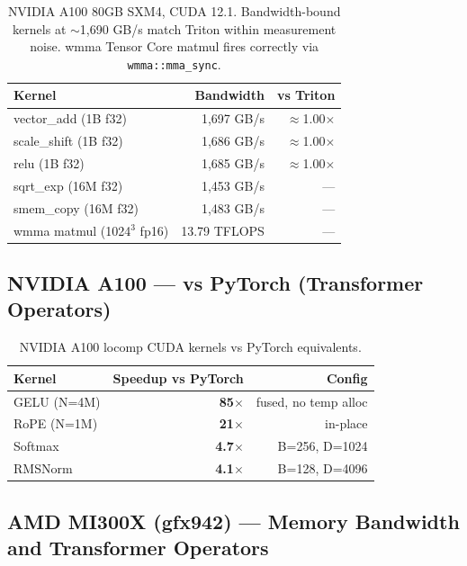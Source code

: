 \documentclass[10pt,twocolumn]{article}
\begin{document}
\begin{table}[H]
\centering
\footnotesize
\begin{tabular}{@{}lrr@{}}
\toprule
\textbf{Kernel} & \textbf{Bandwidth} & \textbf{vs Triton} \\
\midrule
vector\_add (1B f32) & 1,697 GB/s & $\approx$1.00$\times$ \\
scale\_shift (1B f32) & 1,686 GB/s & $\approx$1.00$\times$ \\
relu (1B f32) & 1,685 GB/s & $\approx$1.00$\times$ \\
sqrt\_exp (16M f32) & 1,453 GB/s & --- \\
smem\_copy (16M f32) & 1,483 GB/s & --- \\
wmma matmul (1024$^3$ fp16) & 13.79 TFLOPS & --- \\
\bottomrule
\end{tabular}
\caption{NVIDIA A100 80GB SXM4, CUDA 12.1. Bandwidth-bound kernels at
${\sim}$1,690 GB/s match Triton within measurement noise. wmma Tensor Core
matmul fires correctly via \texttt{wmma::mma\_sync}.}
\label{tab:a100-bw}
\end{table}

\subsection{NVIDIA A100 --- vs PyTorch (Transformer Operators)}

\begin{table}[H]
\centering
\footnotesize
\begin{tabular}{@{}lrr@{}}
\toprule
\textbf{Kernel} & \textbf{Speedup vs PyTorch} & \textbf{Config} \\
\midrule
GELU (N=4M) & \textbf{85$\times$} & fused, no temp alloc \\
RoPE (N=1M) & \textbf{21$\times$} & in-place \\
Softmax & \textbf{4.7$\times$} & B=256, D=1024 \\
RMSNorm & \textbf{4.1$\times$} & B=128, D=4096 \\
\bottomrule
\end{tabular}
\caption{NVIDIA A100 locomp CUDA kernels vs PyTorch equivalents.}
\label{tab:a100-pytorch}
\end{table}

\subsection{AMD MI300X (gfx942) --- Memory Bandwidth and Transformer Operators}
\end{document}
